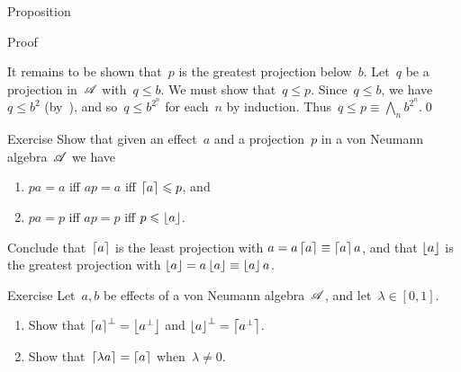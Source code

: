 \documentclass[a]{subfiles}
\begin{document}
\begin{parsec}
\begin{point}{Proposition}
\begin{point}{Proof}
\begin{point}%
It remains to be shown that~$p$ is the greatest projection below~$b$.
Let~$q$ be a projection in~$\mathscr{A}$ with~$q\leq b$.
We must show that~$q\leq p$.
Since~$q\leq b$,
we have~$q\leq b^2$ (by~),
and so~$q\leq b^{2^n}$ for each~$n$ by induction.
Thus~$q\leq p\equiv\bigwedge_n b^{2^n}$.\qed
\end{point}
\end{point}
\end{point}
\begin{point}{Exercise}%
Show that given an effect~$a$ and a projection~$p$
in a von Neumann algebra~$\mathscr{A}$ we have
\begin{enumerate}
\item
$pa=a$ iff $ap=a$ iff $\left\lceil a\right\rceil\leqslant p$, and
\item
$pa=p$ iff $ap=p$ iff $p\leqslant \left\lfloor a\right\rfloor$.
\end{enumerate}
Conclude that~$\left\lceil a\right\rceil$
is the least projection with $a=a\left\lceil a\right\rceil\equiv\left\lceil a\right\rceil a$,
and that $\left\lfloor a\right\rfloor$
is the greatest projection with $\left\lfloor a\right\rfloor=a\left\lfloor a\right\rfloor\equiv \left\lfloor a\right\rfloor a$.
\end{point}
\begin{point}{Exercise}%
Let~$a,b$ be effects of a von Neumann algebra~$\mathscr{A}$,
and let~$\lambda\in [0,1]$.
\begin{enumerate}
\item
Show that $\left\lceil a\right\rceil^\perp = \left\lfloor a^\perp\right\rfloor$
and $\left\lfloor a\right\rfloor^\perp = \left\lceil a^\perp\right\rceil$.
\item
Show that~$\left\lceil\lambda a\right\rceil = \left\lceil a\right\rceil$
when~$\lambda\neq 0$.


\end{enumerate}
\end{point}
\end{parsec}
\end{document}
